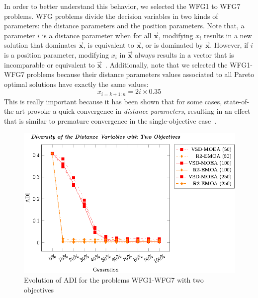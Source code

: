 In order to better understand this behavior, we selected the WFG1 to WFG7 problems.
%
WFG problems divide the decision variables in two kinds of parameters: the distance parameters and the position parameters.
%
Note that, a parameter $i$ is a distance parameter when for all $\vec{\mathbf{x}}$, modifying $x_i$ results in a new solution 
that dominates $\vec{\mathbf{x}}$, is equivalent to $\vec{\mathbf{x}}$, or is dominated by $\vec{\mathbf{x}}$.
%
However, if $i$ is a position parameter, modifying $x_i$ in $\vec{\mathbf{x}}$ always results in a vector that is incomparable or 
equivalent to $\vec{\mathbf{x}}$~\cite{huband2005scalable}.
%
Additionally, note that we selected the WFG1-WFG7 problems because their distance parameters values associated to all Pareto optimal solutions 
have exactly the same values:
%
\begin{equation}
   x_{i=k+1:n} = 2i \times 0.35
\end{equation}
%
This is really important because it has been shown that for some cases, state-of-the-art
\MOEAS{} provoke a quick convergence in \textit{distance parameters}, resulting in an effect that is similar to premature convergence
in the single-objective case~\cite{Joel:GDE3_CEC09}.

\begin{figure}[t]
\centering
%
\includegraphics[scale=0.85]{Images/Graphic-Diversity_2obj_tikz-figure1.eps}
\caption{Evolution of ADI for the problems WFG1-WFG7 with two objectives}\label{fig:Diversity_2obj}
\end{figure}

